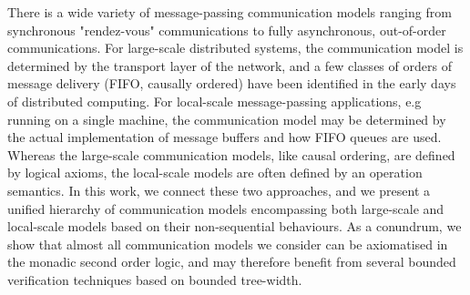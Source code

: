 There is a wide variety of message-passing communication models ranging from synchronous "rendez-vous" 
communications to fully asynchronous, out-of-order communications. For large-scale distributed systems, the
communication model is determined by the transport layer of the network, and a few classes of 
orders of message delivery (FIFO, causally ordered) have been identified in the early days of 
distributed computing. For local-scale message-passing applications, 
e.g running on a single machine, the communication model may be determined by the actual implementation of 
message buffers and how FIFO queues are used. Whereas the large-scale communication
models, like causal ordering, are defined by logical axioms, the local-scale models are often defined by an operation
semantics. In this work, we connect these two approaches, and we present a unified hierarchy of communication
models encompassing both large-scale and local-scale models based on their non-sequential behaviours.
As a conundrum, we show that almost all communication models we consider can be axiomatised in the monadic second order logic,
and may therefore benefit from several bounded verification techniques based on bounded tree-width.